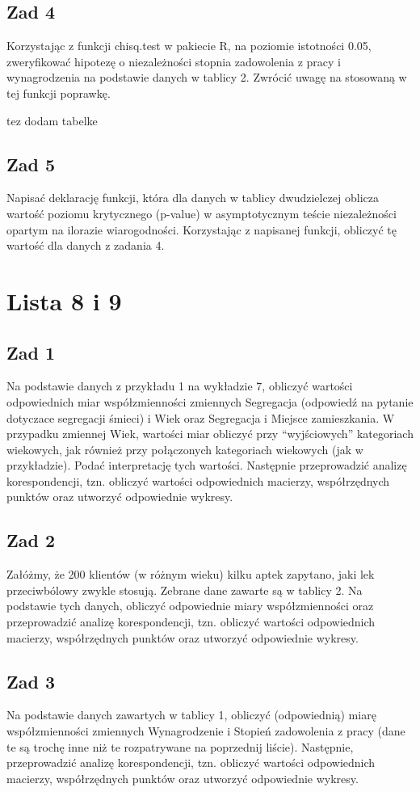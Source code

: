 \documentclass[12pt]{mwart}\usepackage[]{graphicx}\usepackage[]{color}
\begin{document}
\subsection*{Zad 4}
Korzystając z funkcji chisq.test w pakiecie R, na poziomie istotności 0.05, zweryfikować hipotezę o niezależności stopnia zadowolenia z pracy i wynagrodzenia na podstawie danych w tablicy 2. Zwrócić uwagę na stosowaną w tej funkcji poprawkę.

tez dodam tabelke


\subsection*{Zad 5}
Napisać deklarację funkcji, która dla danych w tablicy dwudzielczej oblicza wartość poziomu krytycznego (p-value) w asymptotycznym teście niezależności opartym na ilorazie wiarogodności. Korzystając z napisanej funkcji, obliczyć tę wartość dla danych z zadania 4.

\section*{Lista 8 i 9}
\subsection*{Zad 1}
Na podstawie danych z przykładu 1 na wykładzie 7, obliczyć wartości odpowiednich
miar współzmienności zmiennych Segregacja (odpowiedź na pytanie dotyczace segregacji śmieci) i Wiek oraz Segregacja i Miejsce zamieszkania. W przypadku zmiennej
Wiek, wartości miar obliczyć przy “wyjściowych” kategoriach wiekowych, jak również przy połączonych kategoriach wiekowych (jak w przykładzie). Podać interpretację tych wartości. Następnie przeprowadzić analizę korespondencji, tzn. obliczyć wartości odpowiednich macierzy, współrzędnych punktów oraz utworzyć odpowiednie wykresy.

\subsection*{Zad 2}
Załóżmy, że 200 klientów (w różnym wieku) kilku aptek zapytano, jaki lek przeciwbólowy zwykle stosują. Zebrane dane zawarte są w tablicy 2. Na podstawie tych danych, obliczyć odpowiednie miary współzmienności oraz przeprowadzić analizę korespondencji, tzn. obliczyć wartości odpowiednich macierzy, współrzędnych punktów
oraz utworzyć odpowiednie wykresy.

\subsection*{Zad 3}
Na podstawie danych zawartych w tablicy 1, obliczyć (odpowiednią) miarę współzmienności zmiennych Wynagrodzenie i Stopień zadowolenia z pracy (dane te są trochę inne niż te rozpatrywane na poprzednij liście). Następnie, przeprowadzić analizę korespondencji, tzn. obliczyć wartości odpowiednich macierzy, współrzędnych punktów oraz utworzyć odpowiednie wykresy.
\end{document}
